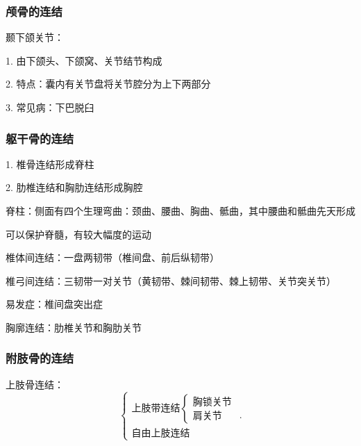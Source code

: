 \subsubsection{颅骨的连结}%
\label{subsub:颅骨的连结}
\begin{notation}
    颞下颌关节：

    1. 由下颌头、下颌窝、关节结节构成
    
    2. 特点：囊内有关节盘将关节腔分为上下两部分

    3. 常见病：下巴脱臼
\end{notation}
\subsubsection{躯干骨的连结}%
\label{subsub:躯干骨的连结}
1. 椎骨连结形成脊柱

2. 肋椎连结和胸肋连结形成胸腔
\begin{notation}
    脊柱：侧面有四个生理弯曲：颈曲、腰曲、胸曲、骶曲，其中腰曲和骶曲先天形成

    可以保护脊髓，有较大幅度的运动
\end{notation}
\begin{notation}
    椎体间连结：一盘两韧带（椎间盘、前后纵韧带）

    椎弓间连结：三韧带一对关节（黄韧带、棘间韧带、棘上韧带、关节突关节）

    易发症：椎间盘突出症
\end{notation}
\begin{notation}
    胸廓连结：肋椎关节和胸肋关节
\end{notation}
\subsubsection{附肢骨的连结}%
\label{subsub:附肢骨的连结}
\begin{notation}
    上肢骨连结：
    \[
        \begin{cases}
            \mbox{上肢带连结}\begin{cases}
                \mbox{胸锁关节}\\
                \mbox{肩关节} 
            \end{cases}\\ 
            \mbox{自由上肢连结}
        \end{cases}
    .\] 
\end{notation}






